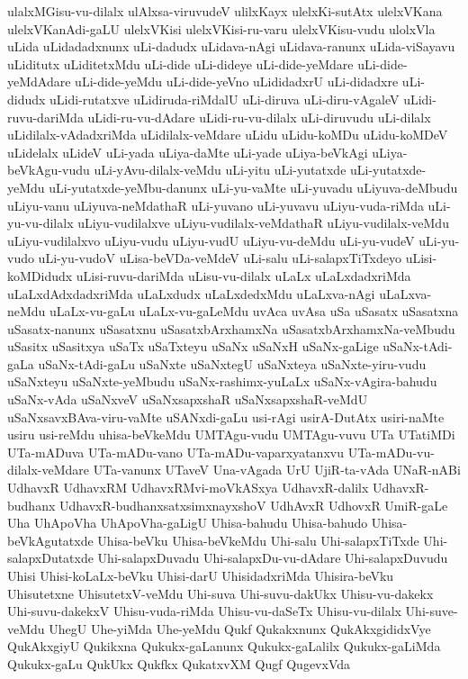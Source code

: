 {ulalxMGisu-vu-dilalx
ulAlxsa-viruvudeV
ulilxKayx
ulelxKi-sutAtx
ulelxVKana
ulelxVKanAdi-gaLU
ulelxVKisi
ulelxVKisi-ru-varu
ulelxVKisu-vudu
ulolxVla
uLida
uLidadadxnunx
uLi-dadudx
uLidava-nAgi
uLidava-ranunx
uLida-viSayavu
uLiditutx
uLiditetxMdu
uLi-dide
uLi-dideye
uLi-dide-yeMdare
uLi-dide-yeMdAdare
uLi-dide-yeMdu
uLi-dide-yeVno
uLididadxrU
uLi-didadxre
uLi-didudx
uLidi-rutatxve
uLidiruda-riMdalU
uLi-diruva
uLi-diru-vAgaleV
uLidi-ruvu-dariMda
uLidi-ru-vu-dAdare
uLidi-ru-vu-dilalx
uLi-diruvudu
uLi-dilalx
uLidilalx-vAdadxriMda
uLidilalx-veMdare
uLidu
uLidu-koMDu
uLidu-koMDeV
uLidelalx
uLideV
uLi-yada
uLiya-daMte
uLi-yade
uLiya-beVkAgi
uLiya-beVkAgu-vudu
uLi-yAvu-dilalx-veMdu
uLi-yitu
uLi-yutatxde
uLi-yutatxde-yeMdu
uLi-yutatxde-yeMbu-danunx
uLi-yu-vaMte
uLi-yuvadu
uLiyuva-deMbudu
uLiyu-vanu
uLiyuva-neMdathaR
uLi-yuvano
uLi-yuvavu
uLiyu-vuda-riMda
uLi-yu-vu-dilalx
uLiyu-vudilalxve
uLiyu-vudilalx-veMdathaR
uLiyu-vudilalx-veMdu
uLiyu-vudilalxvo
uLiyu-vudu
uLiyu-vudU
uLiyu-vu-deMdu
uLi-yu-vudeV
uLi-yu-vudo
uLi-yu-vudoV
uLisa-beVDa-veMdeV
uLi-salu
uLi-salapxTiTxdeyo
uLisi-koMDidudx
uLisi-ruvu-dariMda
uLisu-vu-dilalx
uLaLx
uLaLxdadxriMda
uLaLxdAdxdadxriMda
uLaLxdudx
uLaLxdedxMdu
uLaLxva-nAgi
uLaLxva-neMdu
uLaLx-vu-gaLu
uLaLx-vu-gaLeMdu
uvAca
uvAsa
uSa
uSasatx
uSasatxna
uSasatx-nanunx
uSasatxnu
uSasatxbArxhamxNa
uSasatxbArxhamxNa-veMbudu
uSasitx
uSasitxya
uSaTx
uSaTxteyu
uSaNx
uSaNxH
uSaNx-gaLige
uSaNx-tAdi-gaLa
uSaNx-tAdi-gaLu
uSaNxte
uSaNxtegU
uSaNxteya
uSaNxte-yiru-vudu
uSaNxteyu
uSaNxte-yeMbudu
uSaNx-rashimx-yuLaLx
uSaNx-vAgira-bahudu
uSaNx-vAda
uSaNxveV
uSaNxsapxshaR
uSaNxsapxshaR-veMdU
uSaNxsavxBAva-viru-vaMte
uSANxdi-gaLu
usi-rAgi
usirA-DutAtx
usiri-naMte
usiru
usi-reMdu
uhisa-beVkeMdu
UMTAgu-vudu
UMTAgu-vuvu
UTa
UTatiMDi
UTa-mADuva
UTa-mADu-vano
UTa-mADu-vaparxyatanxvu
UTa-mADu-vu-dilalx-veMdare
UTa-vanunx
UTaveV
Una-vAgada
UrU
UjiR-ta-vAda
UNaR-nABi
UdhavxR
UdhavxRM
UdhavxRMvi-moVkASxya
UdhavxR-dalilx
UdhavxR-budhanx
UdhavxR-budhanxsatxsimxnayxshoV
UdhAvxR
UdhovxR
UmiR-gaLe
Uha
UhApoVha
UhApoVha-gaLigU
Uhisa-bahudu
Uhisa-bahudo
Uhisa-beVkAgutatxde
Uhisa-beVku
Uhisa-beVkeMdu
Uhi-salu
Uhi-salapxTiTxde
Uhi-salapxDutatxde
Uhi-salapxDuvadu
Uhi-salapxDu-vu-dAdare
Uhi-salapxDuvudu
Uhisi
Uhisi-koLaLx-beVku
Uhisi-darU
UhisidadxriMda
Uhisira-beVku
Uhisutetxne
UhisutetxV-veMdu
Uhi-suva
Uhi-suvu-dakUkx
Uhisu-vu-dakekx
Uhi-suvu-dakekxV
Uhisu-vuda-riMda
Uhisu-vu-daSeTx
Uhisu-vu-dilalx
Uhi-suve-veMdu
UhegU
Uhe-yiMda
Uhe-yeMdu
Qukf
Qukakxnunx
QukAkxgididxVye
QukAkxgiyU
Qukikxna
Qukukx-gaLanunx
Qukukx-gaLalilx
Qukukx-gaLiMda
Qukukx-gaLu
QukUkx
Qukfkx
QukatxvXM
Qugf
QugevxVda
}
